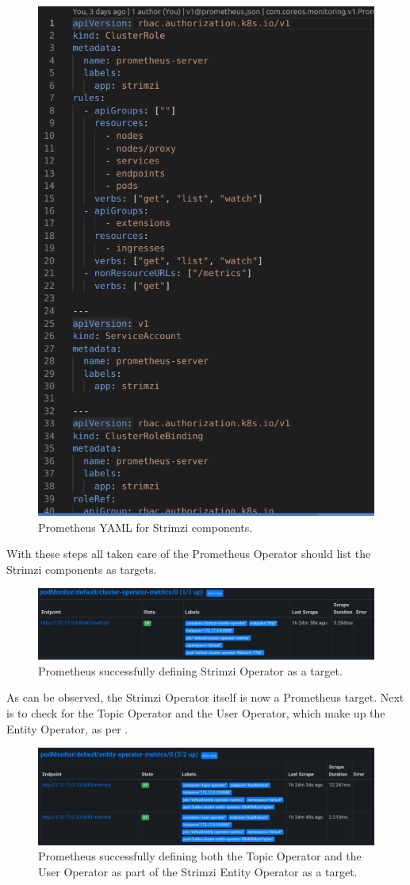 \begin{figure}[H]
	\centering
	\includegraphics[width=0.6\linewidth]{figures/prom_yaml_strimzi.png}
	\caption{Prometheus YAML for Strimzi components.}
	\label{fig:prom_yaml_strimzi}
\end{figure}
With these steps all taken care of the Prometheus Operator should list the Strimzi components as targets.
\begin{figure}[H]
	\centering
	\includegraphics[width=1\linewidth]{figures/prom_taget_strimzi_cluster_operator.png}
	\caption{Prometheus successfully defining Strimzi Operator as a target.}
	\label{fig:prom_taget_strimzi_cluster_operator}
\end{figure}
As can be observed, the Strimzi Operator itself is now a Prometheus target. Next is to check for the Topic Operator and the User Operator, which
make up the Entity Operator, as per .
\begin{figure}[H]
	\centering
	\includegraphics[width=1\linewidth]{figures/prom_target_entity_op.png}
	\caption{Prometheus successfully defining both the Topic Operator and the User Operator as part of the Strimzi Entity Operator as a target.}
	\label{fig:prom_target_strimzi_entity_operator}
\end{figure}
